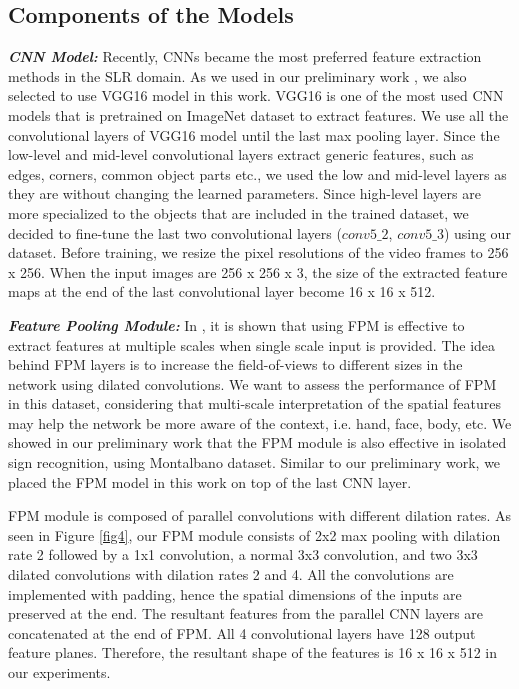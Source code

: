 \documentclass[11pt, a4paper, singlecolumn]{article}
\begin{document}
\subsection{Components of the Models}
\label{sec:components_models}
\textit{\textbf{CNN Model: }} Recently, CNNs became the most preferred feature extraction methods in the SLR domain. As we used in our preliminary work \cite{sincan2019isolated, tur2019isolated}, we also selected to use VGG16 model \cite{simonyan2014very} in this work. VGG16 is one of the most used CNN models that is pretrained on ImageNet \cite{russakovsky2015imagenet} dataset to extract features. We use all the convolutional layers of VGG16 model until the last max pooling layer. Since the low-level and mid-level convolutional layers extract generic features, such as edges, corners, common object parts etc., we used the low and mid-level layers as they are without changing the learned parameters. Since high-level layers are more specialized to the objects that are included in the trained dataset, we decided to fine-tune the last two convolutional layers ($conv5\_2$, $conv5\_3$) using our dataset. Before training, we resize the pixel resolutions of the video frames to 256 x 256. When the input images are 256 x 256 x 3, the size of the extracted feature maps at the end of the last convolutional layer become 16 x 16 x 512. 

\textit{\textbf{Feature Pooling Module: }} In \cite{lim2018foreground}, it is shown that using FPM is effective to extract features at multiple scales when single scale input is provided. The idea behind FPM layers is to increase the field-of-views to different sizes in the network using dilated convolutions. We want to assess the performance of FPM in this dataset, considering that multi-scale interpretation of the spatial features may help the network be more aware of the context, i.e. hand, face, body, etc. We showed in our preliminary work \cite{sincan2019isolated} that the FPM module is also effective in isolated sign recognition, using Montalbano dataset. Similar to our preliminary work, we placed the FPM model in this work on top of the last CNN layer. 

FPM module is composed of parallel convolutions with different dilation rates. As seen in Figure \ref{fig4}, our FPM module consists of 2x2 max pooling with dilation rate 2 followed by a 1x1 convolution, a normal 3x3 convolution, and two 3x3 dilated convolutions with dilation rates 2 and 4. All the convolutions are implemented with padding, hence the spatial dimensions of the inputs are preserved at the end. The resultant features from the parallel CNN layers are concatenated at the end of FPM. All 4 convolutional layers have 128 output feature planes. Therefore, the resultant shape of the features is 16 x 16 x 512 in our experiments.
\end{document}
